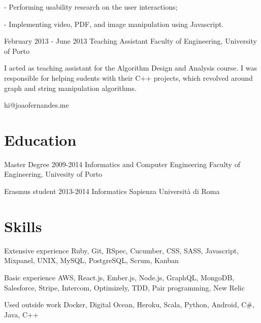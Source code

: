 \documentclass{tccv}
\begin{document}
\begin{eventlist}
- Performing usability research on the user interactions;

- Implementing video, PDF, and image manipulation using Javascript.

\item{February 2013 - June 2013}
     {Teaching Assistant}
     {Faculty of Engineering, University of Porto}

I acted as teaching assistant for the Algorithm Design and Analysis course. I was
responsible for helping sudents with their C++ projects, which revolved around graph
and string manipulation algorithms.

\end{eventlist}

    {hi@joaofernandes.me}

\section{Education}

\begin{yearlist}

\item[Master Degree]{2009-2014}
     {Informatics and Computer Engineering}
     {Faculty of Engineering, Univesity of Porto}

\item[Erasmus student]{2013-2014}
     {Informatics}
     {Sapienza Università di Roma}

\end{yearlist}

\section{Skills}

\begin{factlist}

\item{Extensive experience}
     {Ruby, Git, RSpec, Cucumber, CSS, SASS, Javascript, Mixpanel, UNIX,
     MySQL, PostgreSQL, Scrum, Kanban}

\item{Basic experience}
     {AWS, React.js, Ember.js, Node.js, GraphQL, MongoDB, Salesforce, Stripe, Intercom, Optimizely, TDD,
     Pair programming, New Relic}

\item{Used outside work}
     {Docker, Digital Ocean, Heroku, Scala, Python, Android, C\#, Java, C++}

\end{factlist}
\end{document}
